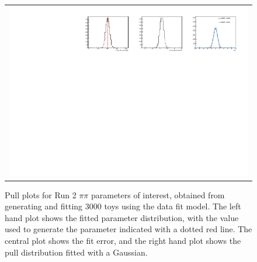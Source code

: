 \begin{figure}
\begin{tabular}{c}
\includegraphics[width=\textwidth]{ANA_resources/Plots/Data_fit/FitterBias//N_Bs_pipi_run2.pdf} \\
  \end{tabular}
  \caption{Pull plots for Run 2 $\pi\pi$ parameters of interest, obtained from generating and fitting 3000 toys using the data fit model. The left hand plot shows the fitted parameter distribution, with the value used to generate the parameter indicated with a dotted red line. The central plot shows the fit error, and the right hand plot shows the pull distribution fitted with a Gaussian.}
\label{fig:pipi_run2_pulls}
\end{figure}
